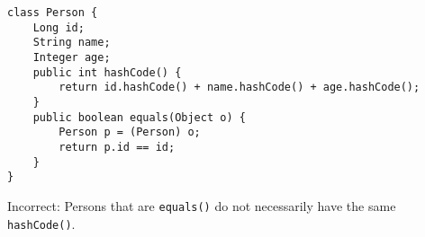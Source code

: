 \question \begin{lstlisting}
class Person {
    Long id;
    String name;
    Integer age;
    public int hashCode() {
        return id.hashCode() + name.hashCode() + age.hashCode();
    }
    public boolean equals(Object o) {
        Person p = (Person) o;
        return p.id == id;
    }
}
\end{lstlisting}

\begin{solution}[0.25in]
Incorrect: Persons that are \lstinline$equals()$ do not necessarily have the
same \lstinline$hashCode()$.
\end{solution}

